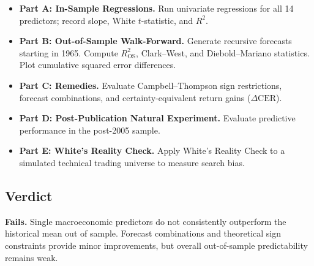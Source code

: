 \begin{itemize}
  \item \textbf{Part A: In-Sample Regressions.} Run univariate regressions for all 14 predictors; record slope, White $t$-statistic, and $R^2$.
  \item \textbf{Part B: Out-of-Sample Walk-Forward.} Generate recursive forecasts starting in 1965. Compute $R^2_{\text{OS}}$, Clark--West, and Diebold--Mariano statistics. Plot cumulative squared error differences.
  \item \textbf{Part C: Remedies.} Evaluate Campbell--Thompson sign restrictions, forecast combinations, and certainty-equivalent return gains ($\Delta \text{CER}$).
  \item \textbf{Part D: Post-Publication Natural Experiment.} Evaluate predictive performance in the post-2005 sample.
  \item \textbf{Part E: White's Reality Check.} Apply White's Reality Check to a simulated technical trading universe to measure search bias.
\end{itemize}

\subsection*{Verdict}
\textbf{Fails.} Single macroeconomic predictors do not consistently outperform the historical mean out of sample. Forecast combinations and theoretical sign constraints provide minor improvements, but overall out-of-sample predictability remains weak.
